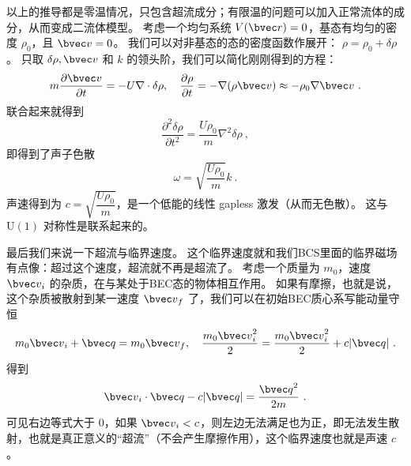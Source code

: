 以上的推导都是零温情况，只包含超流成分；有限温的问题可以加入正常流体的成分，从而变成二流体模型。 考虑一个均匀系统 $V(\bvec r) = 0$，基态有均匀的密度 $\rho_0$，且 ${\bvec v} = 0$。 我们可以对非基态的态的密度函数作展开： $\rho = \rho_0+\delta\rho$。 只取 $\delta\rho,{\bvec v}$ 和 $k$ 的领头阶，我们可以简化刚刚得到的方程：
\begin{equation}
m\frac{\partial\bvec v}{\partial t} = -U\nabla\cdot\delta\rho,\quad \frac{\partial\rho}{\partial t} = -\nabla(\rho{\bvec v}) \approx-\rho_0\nabla\bvec v~.
\end{equation}
联合起来就得到
\begin{equation}
\frac{\partial^2\delta\rho}{\partial t^2} = \frac{U\rho_0}{m}\nabla^2\delta\rho~,
\end{equation}
即得到了声子色散
\begin{equation}
\omega = \sqrt{\frac{U\rho_0}{m}}k~.
\end{equation}
声速得到为 $c=\sqrt{\dfrac{U\rho_0}{m}}$，是一个低能的线性 gapless 激发（从而无色散）。 这与 $\text{U}(1)$ 对称性是联系起来的。

最后我们来说一下超流与临界速度。 这个临界速度就和我们BCS里面的临界磁场有点像：超过这个速度，超流就不再是超流了。
考虑一个质量为 $m_0$，速度 ${\bvec v}_i$ 的杂质，在与某处于BEC态的物体相互作用。 如果有摩擦，也就是说，这个杂质被散射到某一速度 ${\bvec v}_f$ 了，我们可以在初始BEC质心系写能动量守恒
\begin{equation}
m_0{\bvec v}_i + {\bvec q} = m_0{\bvec v}_f,\quad \frac{m_0{\bvec v}_i^2}{2} = \frac{m_0{\bvec v}_i^2}{2} + c|{\bvec q}|~.
\end{equation}
得到
\begin{equation}
{\bvec v}_i\cdot{\bvec q}-c|{\bvec q}| = \frac{{\bvec q}^2}{2m}~.
\end{equation}
可见右边等式大于 $0$，如果 ${\bvec v}_i<c$，则左边无法满足也为正，即无法发生散射，也就是真正意义的“超流”（不会产生摩擦作用），这个临界速度也就是声速 $c$。
